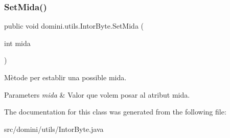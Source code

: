 \subsubsection{\texorpdfstring{Set\+Mida()}{SetMida()}}
{\footnotesize\ttfamily public void domini.\+utils.\+Intor\+Byte.\+Set\+Mida (\begin{DoxyParamCaption}\item[{int}]{mida }\end{DoxyParamCaption})\hspace{0.3cm}{\ttfamily [inline]}}



Mètode per establir una possible mida. 


\begin{DoxyParams}{Parameters}
{\em mida} & Valor que volem posar al atribut mida. \\
\hline
\end{DoxyParams}


The documentation for this class was generated from the following file\+:\begin{DoxyCompactItemize}
\item 
src/domini/utils/Intor\+Byte.\+java\end{DoxyCompactItemize}
